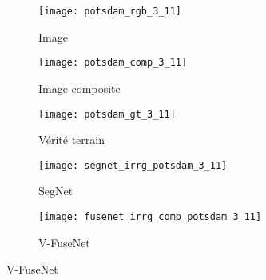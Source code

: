 \begin{figure}[h]
	\begin{subfigure}{0.32\textwidth}
    \texttt{[image: potsdam\_rgb\_3\_11]}
    \caption{Image }
    \end{subfigure}
    \begin{subfigure}{0.32\textwidth}
    \texttt{[image: potsdam\_comp\_3\_11]}
    \caption{Image composite}
    \end{subfigure}
    \begin{subfigure}{0.32\textwidth}
    \texttt{[image: potsdam\_gt\_3\_11]}
    \caption{Vérité terrain}
    \end{subfigure}
    \begin{subfigure}{0.49\textwidth}
    \texttt{[image: segnet\_irrg\_potsdam\_3\_11]}
    \caption{SegNet}
    \end{subfigure}
    \begin{subfigure}{0.49\textwidth}
    \texttt{[image: fusenet\_irrg\_comp\_potsdam\_3\_11]}
    \caption{V-FuseNet}
    \end{subfigure}
    \label{fig:potsdam_images}
\end{figure}

